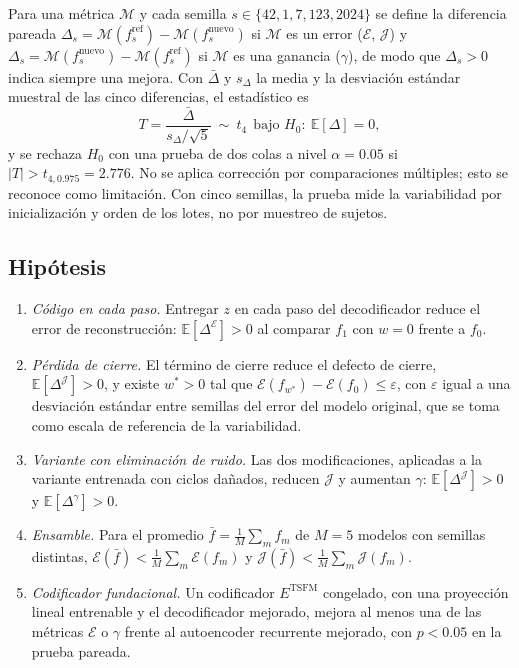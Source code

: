 \documentclass[11pt,a4paper]{article}
\newcommand{\E}{\mathbb{E}}
\begin{document}
Para una métrica $\mathcal M$ y cada semilla $s\in\{42,1,7,123,2024\}$ se define la diferencia pareada $\Delta_s=\mathcal M(f^{\text{ref}}_s)-\mathcal M(f^{\text{nuevo}}_s)$ si $\mathcal M$ es un error ($\mathcal E$, $\mathcal J$) y $\Delta_s=\mathcal M(f^{\text{nuevo}}_s)-\mathcal M(f^{\text{ref}}_s)$ si $\mathcal M$ es una ganancia ($\gamma$), de modo que $\Delta_s>0$ indica siempre una mejora. Con $\bar\Delta$ y $s_\Delta$ la media y la desviación estándar muestral de las cinco diferencias, el estadístico es
\begin{equation}
T=\frac{\bar\Delta}{s_\Delta/\sqrt 5}\ \sim\ t_4\ \ \text{bajo } H_0:\ \E[\Delta]=0 ,
\end{equation}
y se rechaza $H_0$ con una prueba de dos colas a nivel $\alpha=0.05$ si $|T|>t_{4,0.975}=2.776$. No se aplica corrección por comparaciones múltiples; esto se reconoce como limitación. Con cinco semillas, la prueba mide la variabilidad por inicialización y orden de los lotes, no por muestreo de sujetos.

\subsection{Hipótesis}

\begin{enumerate}[label=\textbf{H\arabic*.},leftmargin=2.2em]
\item \textit{Código en cada paso.} Entregar $z$ en cada paso del decodificador reduce el error de reconstrucción: $\E[\Delta^{\mathcal E}]>0$ al comparar $f_1$ con $w=0$ frente a $f_0$.
\item \textit{Pérdida de cierre.} El término de cierre reduce el defecto de cierre, $\E[\Delta^{\mathcal J}]>0$, y existe $w^\ast>0$ tal que $\mathcal E(f_{w^\ast})-\mathcal E(f_0)\le\varepsilon$, con $\varepsilon$ igual a una desviación estándar entre semillas del error del modelo original, que se toma como escala de referencia de la variabilidad.
\item \textit{Variante con eliminación de ruido.} Las dos modificaciones, aplicadas a la variante entrenada con ciclos dañados, reducen $\mathcal J$ y aumentan $\gamma$: $\E[\Delta^{\mathcal J}]>0$ y $\E[\Delta^{\gamma}]>0$.
\item \textit{Ensamble.} Para el promedio $\bar f=\frac1M\sum_m f_m$ de $M=5$ modelos con semillas distintas, $\mathcal E(\bar f)<\frac1M\sum_m\mathcal E(f_m)$ y $\mathcal J(\bar f)<\frac1M\sum_m\mathcal J(f_m)$.
\item \textit{Codificador fundacional.} Un codificador $E^{\text{TSFM}}$ congelado, con una proyección lineal entrenable y el decodificador mejorado, mejora al menos una de las métricas $\mathcal E$ o $\gamma$ frente al autoencoder recurrente mejorado, con $p<0.05$ en la prueba pareada.
\end{enumerate}
\end{document}
